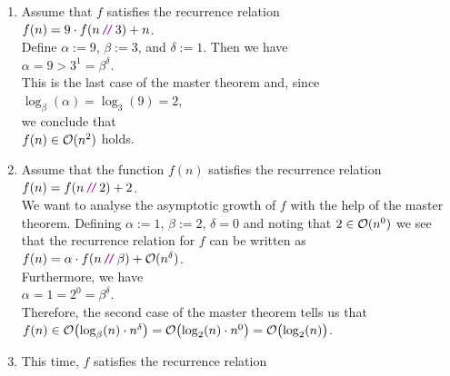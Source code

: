 \examples
\begin{enumerate}
\item Assume that $f$ satisfies the recurrence relation
      \\[0.2cm]
      \hspace*{1.3cm}
      $f(n) = 9 \cdot f(n \dv 3) + n$.
      \\[0.2cm] 
      Define $\alpha := 9$, $\beta := 3$, and $\delta := 1$.
      Then we have
      \\[0.2cm]
      \hspace*{1.3cm}
      $\alpha = 9 > 3^1 = \beta^\delta$.
      \\[0.2cm] 
      This is the last case of the master theorem and, since 
      \\[0.2cm]
      \hspace*{1.3cm}
      $\log_{\beta}(\alpha) = \log_3(9) = 2$,
      \\[0.2cm]
      we conclude that
      \\[0.2cm]
      \hspace*{1.3cm}
      $f(n) \in \mathcal{O}(n^2)$ \quad holds.
\item Assume that the function $f(n)$ satisfies the recurrence relation
      \\[0.2cm]
      \hspace*{1.3cm}
      $f(n) = f(n \dv 2) + 2$.
      \\[0.2cm]
      We want to analyse the asymptotic growth of $f$ with the help of the master theorem.
      Defining $\alpha := 1$, $\beta := 2$,  $\delta = 0$ and noting that $2 \in \mathcal{O}(n^0)$ we see that
      the recurrence relation for $f$ can be written as
      \\[0.2cm]
      \hspace*{1.3cm}
      $f(n) = \alpha \cdot f(n \dv \beta) + \Oh(n^\delta)$.
      \\[0.2cm]
      Furthermore, we have
      \\[0.2cm]
      \hspace*{1.3cm}
      $\alpha = 1 = 2^0 = \beta^\delta$.
      \\[0.2cm]
      Therefore, the second case of the master theorem tells us that
      \\[0.2cm]
      \hspace*{1.3cm}
      $f(n) \in \mathcal{O}\bigl(\log_\beta(n) \cdot n^\delta\bigr) = \mathcal{O}\bigl(\log_2(n) \cdot n^0\bigr) = \mathcal{O}\bigl(\log_2(n)\bigr)$.
\item This time, $f$ satisfies the recurrence relation 
      \\[0.2cm]

\end{enumerate}
